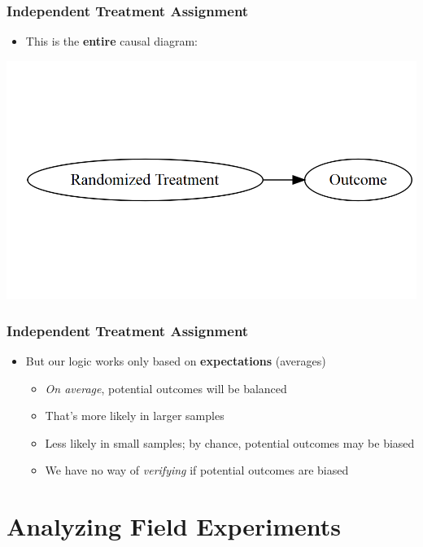 \documentclass[xcolor=x11names,compress]{beamer}\usepackage[]{graphicx}\usepackage[]{color}
\makeatletter
\def\maxwidth{ %
  \ifdim\Gin@nat@width>\linewidth
    \linewidth
  \else
    \Gin@nat@width
  \fi
}
\newenvironment{knitrout}{}{} %
\renewcommand{\(}{\begin{columns}}
\renewcommand{\)}{\end{columns}}
\newcommand{\<}[1]{\begin{column}{#1}}
\renewcommand{\>}{\end{column}}
\makeatother
\begin{document}
\begin{frame}
\frametitle{Independent Treatment Assignment}
\begin{itemize}
\item This is the \textbf{entire} causal diagram:
\end{itemize}
\pause
\begin{knitrout}
\color{fgcolor}
\includegraphics[width=\maxwidth]{figure/explanation1-1} 

\end{knitrout}
\end{frame}

\begin{frame}
\frametitle{Independent Treatment Assignment}
\begin{itemize}
\item But our logic works only based on \textbf{expectations} (averages)
\pause
\begin{itemize}
\item \textit{On average}, potential outcomes will be balanced
\pause
\item That's more likely in larger samples
\pause
\item Less likely in small samples; by chance, potential outcomes may be biased
\pause
\item We have no way of \textit{verifying} if potential outcomes are biased
\end{itemize}
\end{itemize}
\end{frame}

\section{Analyzing Field Experiments}
\end{document}
